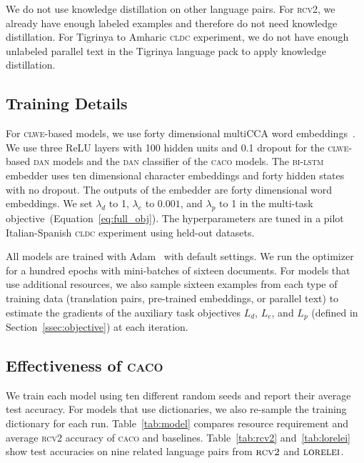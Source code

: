 \documentclass[letterpaper]{article} %
\newcommand{\citep}{\cite}
\newcommand{\abr}[1]{\textsc{#1}}
\newcommand{\name}[0]{\textsc{caco}}
\begin{document}
We do not use knowledge distillation on other language pairs.
For \abr{rcv2}, we already have enough labeled examples and therefore do not
need knowledge distillation.
For Tigrinya to Amharic \abr{cldc} experiment, we do not have enough unlabeled
parallel text in the Tigrinya language pack to apply knowledge distillation.

\subsection{Training Details}
\label{sec:hyperparameter}

For \abr{clwe}-based models, we use forty dimensional multiCCA
word embeddings~\citep{ammar-16}. 
We use three ReLU layers with 100 hidden units and 0.1 dropout for the
\abr{clwe}-based \abr{dan} models and the \abr{dan} classifier of the \name{}
models.
The \abr{bi-lstm} embedder uses ten dimensional character embeddings and forty
hidden states with no dropout.  The outputs of the embedder are forty
dimensional word embeddings.
We set $\lambda_d$ to 1, $\lambda_e$ to $0.001$, and $\lambda_p$ to 1 in the
multi-task objective~(Equation~\ref{eq:full_obj}).
The hyperparameters are tuned in a pilot Italian-Spanish \abr{cldc} experiment
using held-out datasets.

All models are trained with Adam~\citep{kingma-15} with default settings.
We run the optimizer for a hundred epochs with mini-batches of sixteen
documents.  For models that use additional resources, we also sample sixteen
examples from each type of training data (translation pairs, pre-trained
embeddings, or parallel text) to estimate the gradients of the auxiliary task
objectives $L_d$, $L_e$, and $L_p$ (defined in Section~\ref{ssec:objective}) at each
iteration.

\subsection{Effectiveness of \name{}}\label{ssec:analysis}
 
We train each model using ten different random seeds and report their average
test accuracy.
For models that use dictionaries, we also re-sample the training dictionary for
each run.
Table~\ref{tab:model} compares resource requirement and average \abr{rcv2}
accuracy of \name{} and baselines.
Table~\ref{tab:rcv2} and~\ref{tab:lorelei} show test accuracies on nine related
language pairs from $\abr{rcv2}$ and $\abr{lorelei}$.
\end{document}

